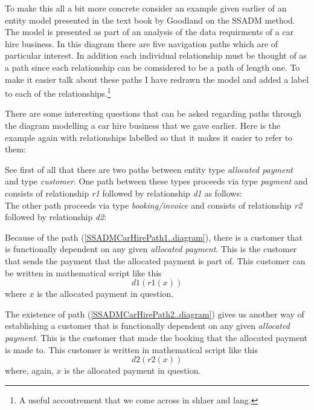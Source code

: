\mynote 
To make this all a bit more concrete consider an example given earlier of an entity model presented in the text book by Goodland on the SSADM method.
The model is presented as part of an analysis of the data requirments of a car hire business. In this diagram there are five navigation paths which are of particular interest. In addition each individual relationship must be thought of as a path since each relationship can be comsidered to be a path of length one. To make it easier talk about these paths I have redrawn the model and added a label to each of the relationships.\footnote{A useful accoutrement that we come across in shlaer and lang.} 

\mynote
There are some interesting questions that can be asked regarding paths through the diagram modelling a car hire business that we gave earlier. Here is the example again with relationships labelled so that it makes it easier to refer to them:

See first of all that there are two paths between entity type \textit{allocated payment} and type \textit{customer}.
One path between these types proceeds via type \textit{payment} and consists of relationship \textit{r1} followed by relationship \textit{d1} as follows:
\begin{equation}
\label{SSADMCarHirePath1..diagram}

\end{equation}
The other path proceeds via type \textit{booking/invoice} and consists of relationship \textit{r2} followed by relationship \textit{d2}:
\begin{equation}
\label{SSADMCarHirePath2..diagram}

\end{equation}

Because of the path (\ref{SSADMCarHirePath1..diagram}),
there is a customer that is functionally dependent on any 
given  \textit{allocated payment}. This is the customer that sends the payment that the allocated payment is part of. This customer can be written in mathematical script like this
\begin{equation*}
d1(r1(x))
\end{equation*}
where $x$ is the allocated payment in question. 

The existence of path (\ref{SSADMCarHirePath2..diagram}) gives us another 
way of establishing a customer that is functionally dependent on any 
given  \textit{allocated payment}. This is the customer that made the booking
that the allocated payment is made to. This customer is written in mathematical script like this
\begin{equation*}
d2(r2(x))
\end{equation*}
where, again, $x$ is the allocated payment in question. 

